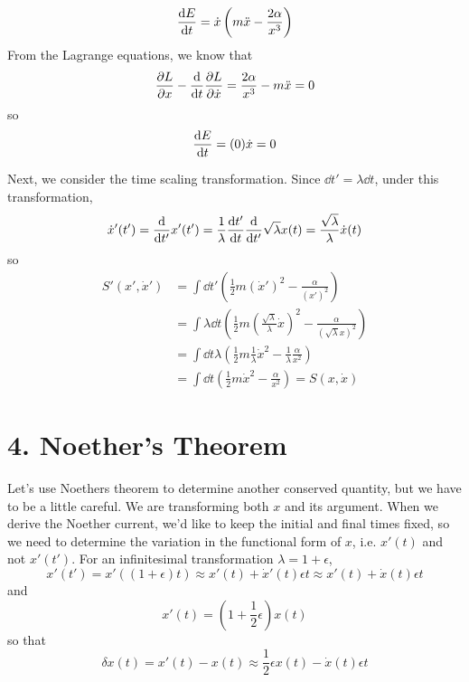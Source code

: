 \documentclass[a4paper,twoside]{article}
\begin{document}
\begin{problem}
    \begin{equation}
        \dv{E}{t} = \dot{x}\left( m\ddot{x} - \frac{2 \alpha}{x^3} \right)
    \end{equation}
    From the Lagrange equations, we know that
    \begin{equation}
        \pdv{L}{x} - \dv{t} \pdv{L}{\dot{x}} = \frac{2 \alpha}{x^3} - m\ddot{x} = 0
    \end{equation}
    so
    \begin{equation}
        \dv{E}{t} = (0)\dot{x} = 0
    \end{equation}

    Next, we consider the time scaling transformation. Since $ \dd{t'} = \lambda \dd{t} $, under this transformation,
    \begin{equation}
        \dot{x}'(t') = \dv{t'} x'(t') = \frac{1}{\lambda} \dv{t'}{t} \dv{t'} \sqrt{\lambda} x(t) = \frac{\sqrt{\lambda}}{\lambda} \dot{x}(t)
    \end{equation}
    so
    \begin{align}
        S'(x', \dot{x}') &= \int \dd{t'} \left( \frac{1}{2} m (\dot{x}')^2 - \frac{\alpha}{(x')^2} \right) \\
        &= \int \lambda \dd{t} \left( \frac{1}{2} m \left( \frac{\sqrt{\lambda}}{\lambda} \dot{x} \right)^2 - \frac{\alpha}{(\sqrt{\lambda} x)^2} \right) \\
        &= \int \dd{t} \lambda \left( \frac{1}{2} m \frac{1}{\lambda} \dot{x}^2 - \frac{1}{\lambda} \frac{\alpha}{x^2} \right) \\
        &= \int \dd{t} \left( \frac{1}{2} m\dot{x}^2 - \frac{\alpha}{x^2} \right) = S(x,\dot{x})
    \end{align}
\end{problem}

\section*{4. Noether's Theorem}
Let's use Noethers theorem to determine another conserved quantity, but we have to be a little careful. We are transforming both $ x $ and its argument. When we derive the Noether current, we'd like to keep the initial and final times fixed, so we need to determine the variation in the functional form of $ x $, i.e. $ x'(t) $ and not $ x'(t') $. For an infinitesimal transformation $ \lambda = 1 + \epsilon $,
\begin{equation}
    x'(t') = x'( (1+ \epsilon)t) \approx x'(t) + \dot{x}'(t) \epsilon t \approx x'(t) + \dot{x}(t) \epsilon t
\end{equation}
and
\begin{equation}
    x'(t) = \left( 1 + \frac{1}{2} \epsilon \right) x(t)
\end{equation}
so that
\begin{equation}
    \delta x(t) = x'(t) - x(t) \approx \frac{1}{2} \epsilon x(t) - \dot{x}(t) \epsilon t
\end{equation}
\end{document}

